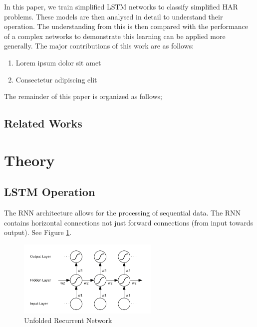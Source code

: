 \documentclass[sensors,article,submit,moreauthors,pdftex]{Definitions/mdpi}
\begin{document}
In this paper, we train simplified LSTM networks to classify simplified HAR problems. These models are then analysed in detail to understand their operation. The understanding from this is then compared with the performance of a complex networks to demonstrate this learning can be applied more generally. The major contributions of this work are as follows:
\begin{enumerate}
\item Lorem ipsum dolor sit amet
\item Consectetur adipiscing elit
\end{enumerate}

The remainder of this paper is organized as follows;
\subsection{Related Works}

\section{Theory}
\subsection{LSTM Operation} %
The RNN architecture allows for the processing of sequential data. The RNN contains horizontal connections not just forward connections (from input towards output). See Figure \ref{fig:rnn_structure}.

\begin{figure}[!hbt]
    \centering
    \includegraphics[width=0.6\textwidth]{Figures/rnn_structure.png}
    \caption{Unfolded Recurrent Network\cite{Graves2012}}
    \label{fig:rnn_structure}
\end{figure}
\end{document}
